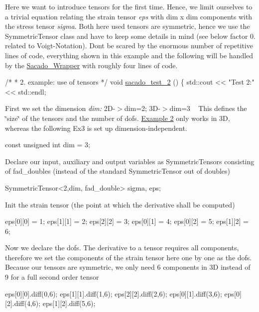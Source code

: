 Here we want to introduce tensors for the first time. Hence, we limit ourselves to a trivial equation relating the strain tensor {\itshape eps} with dim x dim components with the stress tensor {\itshape sigma}. Both here used tensors are symmetric, hence we use the Symmetric\+Tensor class and have to keep some details in mind (see below factor 0. related to Voigt-\/\+Notation). Don\textquotesingle{}t be scared by the enormous number of repetitive lines of code, everything shown in this example and the following will be handled by the \hyperlink{namespaceSacado__Wrapper}{Sacado\+\_\+\+Wrapper} with roughly four lines of code. 
\begin{DoxyCode}
\textcolor{comment}{/*}
\textcolor{comment}{ * 2. example: use of tensors}
\textcolor{comment}{ */}
\textcolor{keywordtype}{void} \hyperlink{Sacado__example_8cc_a8ef4ff1e9526ca8451cdcd1678366d2c}{sacado\_test\_2} ()
\{
    std::cout << \textcolor{stringliteral}{"Test 2:"} << std::endl;
\end{DoxyCode}
 First we set the dimension {\itshape dim\+:} 2\+D-\/$>$dim=2; 3\+D-\/$>$dim=3 ~\newline
 This defines the \char`\"{}size\char`\"{} of the tensors and the number of dofs. \hyperlink{index_Ex2}{Example 2} only works in 3D, whereas the following Ex3 is set up dimension-\/independent. 
\begin{DoxyCode}
\textcolor{keyword}{const} \textcolor{keywordtype}{unsigned} \textcolor{keywordtype}{int} dim = 3;
\end{DoxyCode}
 Declare our input, auxiliary and output variables as Symmetric\+Tensors consisting of fad\+\_\+doubles (instead of the standard Symmetric\+Tensor out of doubles) 
\begin{DoxyCode}
SymmetricTensor<2,dim, fad\_double> sigma, eps;
\end{DoxyCode}
 Init the strain tensor (the point at which the derivative shall be computed) 
\begin{DoxyCode}
eps[0][0] = 1;
eps[1][1] = 2;
eps[2][2] = 3;
eps[0][1] = 4;
eps[0][2] = 5;
eps[1][2] = 6;
\end{DoxyCode}
 Now we declare the dofs. The derivative to a tensor requires all components, therefore we set the components of the strain tensor here one by one as the dofs. Because our tensors are symmetric, we only need 6 components in 3D instead of 9 for a full second order tensor 
\begin{DoxyCode}
eps[0][0].diff(0,6);
eps[1][1].diff(1,6);
eps[2][2].diff(2,6);
eps[0][1].diff(3,6);
eps[0][2].diff(4,6);
eps[1][2].diff(5,6);
\end{DoxyCode}
